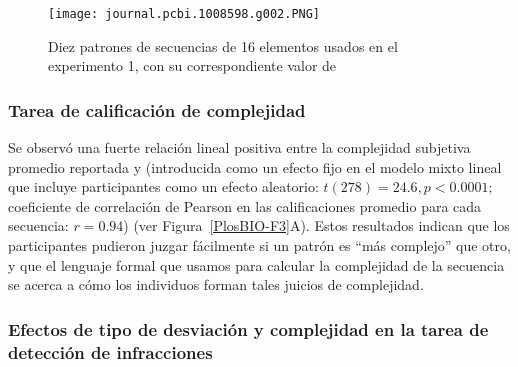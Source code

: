 \begin{figure}[t!]
   \texttt{[image: journal.pcbi.1008598.g002.PNG]}
   \centering
   \caption{Diez patrones de secuencias de 16 elementos usados en el experimento 1, con su correspondiente valor de \mdlbin}
   \label{PlosBIO-F2}
\end{figure}

\subsubsection*{Tarea de calificación de complejidad}


Se observó una fuerte relación lineal positiva entre la complejidad subjetiva promedio reportada y \mdlbin (introducida como un efecto fijo en el modelo mixto lineal que incluye participantes como un efecto aleatorio: $t (278) = 24.6, p < 0.0001;$ coeficiente de correlación de Pearson en las calificaciones promedio para cada secuencia: $r = 0.94$) (ver Figura~\ref{PlosBIO-F3}A). Estos resultados indican que los participantes pudieron juzgar fácilmente si un patrón es ``más complejo'' que otro, y que el lenguaje formal que usamos para calcular la complejidad de la secuencia se acerca a cómo los individuos forman tales juicios de complejidad.

\subsubsection*{Efectos de tipo de desviación y complejidad en la tarea de detección de infracciones}

